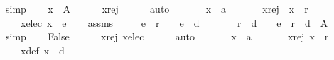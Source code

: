 \begin{isabellebody}
\ simp\isanewline
\ \ \isamarkupfalse%
\ {\isachardoublequoteopen}x\ {\isasymin}\ A{\isachardoublequoteclose}\isanewline
\ \ \ \ \isamarkupfalse%
\ x{\isacharunderscore}{\kern0pt}rej\isanewline
\ \ \ \ \isamarkupfalse%
\ auto\isanewline
{}\isamarkupfalse%
\isanewline
\ \ \isamarkupfalse%
\isanewline
\ \ \ \ x\ {\isacharcolon}{\kern0pt}{\isacharcolon}{\kern0pt}\ {\isachardoublequoteopen}{\isacharprime}{\kern0pt}a{\isachardoublequoteclose}\isanewline
\ \ \isamarkupfalse%
\isanewline
\ \ \ \ x{\isacharunderscore}{\kern0pt}rej{\isacharcolon}{\kern0pt}\ \ {\isachardoublequoteopen}x\ {\isasymin}\ r{\isachardoublequoteclose}\ \isanewline
\ \ \ \ x{\isacharunderscore}{\kern0pt}elec{\isacharcolon}{\kern0pt}\ {\isachardoublequoteopen}x\ {\isasymin}\ e{\isachardoublequoteclose}\isanewline
\ \ \isamarkupfalse%
\ assms\ \isamarkupfalse%
\isanewline
\ \ \ \ {\isachardoublequoteopen}{\isacharparenleft}{\kern0pt}e\ {\isasyminter}\ r\ {\isacharequal}{\kern0pt}\ {\isacharbraceleft}{\kern0pt}{\isacharbraceright}{\kern0pt}{\isacharparenright}{\kern0pt}\ {\isasymand}\ {\isacharparenleft}{\kern0pt}e\ {\isasyminter}\ d\ {\isacharequal}{\kern0pt}\ {\isacharbraceleft}{\kern0pt}{\isacharbraceright}{\kern0pt}{\isacharparenright}{\kern0pt}\ {\isasymand}\isanewline
\ \ \ \ {\isacharparenleft}{\kern0pt}r\ {\isasyminter}\ d\ {\isacharequal}{\kern0pt}\ {\isacharbraceleft}{\kern0pt}{\isacharbraceright}{\kern0pt}{\isacharparenright}{\kern0pt}\ {\isasymand}\ {\isacharparenleft}{\kern0pt}e\ {\isasymunion}\ r\ {\isasymunion}\ d\ {\isacharequal}{\kern0pt}\ A{\isacharparenright}{\kern0pt}{\isachardoublequoteclose}\isanewline
\ \ \ \ \isamarkupfalse%
\ simp\isanewline
\ \ \isamarkupfalse%
\ {\isachardoublequoteopen}False{\isachardoublequoteclose}\isanewline
\ \ \ \ \isamarkupfalse%
\ x{\isacharunderscore}{\kern0pt}rej\ x{\isacharunderscore}{\kern0pt}elec\isanewline
\ \ \ \ \isamarkupfalse%
\ auto\isanewline
{}\isamarkupfalse%
\isanewline
\ \ \isamarkupfalse%
\isanewline
\ \ \ \ x\ {\isacharcolon}{\kern0pt}{\isacharcolon}{\kern0pt}\ {\isachardoublequoteopen}{\isacharprime}{\kern0pt}a{\isachardoublequoteclose}\isanewline
\ \ \isamarkupfalse%
\isanewline
\ \ \ \ x{\isacharunderscore}{\kern0pt}rej{\isacharcolon}{\kern0pt}\ {\isachardoublequoteopen}x\ {\isasymin}\ r{\isachardoublequoteclose}\ \isanewline
\ \ \ \ x{\isacharunderscore}{\kern0pt}def{\isacharcolon}{\kern0pt}\ {\isachardoublequoteopen}x\ {\isasymin}\ d{\isachardoublequoteclose}\isanewline

\end{isabellebody}
